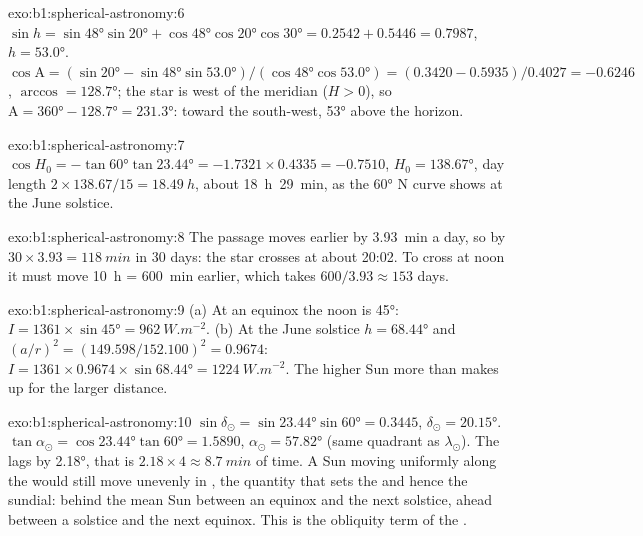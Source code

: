 \begin{solution}{exo:b1:spherical-astronomy:6}
$\sin h = \sin\ang{48}\sin\ang{20} + \cos\ang{48}\cos\ang{20}\cos\ang{30}
= 0.2542 + 0.5446 = 0.7987$, $h = \ang{53.0}$.
$\cos\mathrm{A} = (\sin\ang{20} - \sin\ang{48}\sin\ang{53.0})/(\cos\ang{48}
\cos\ang{53.0}) = (0.3420 - 0.5935)/0.4027 = -0.6246$, $\arccos = \ang{128.7}$;
the star is west of the meridian ($H > 0$), so $\mathrm{A} = \ang{360} -
\ang{128.7} = \ang{231.3}$: toward the south-west, \ang{53} above the horizon.
\end{solution}

\begin{solution}{exo:b1:spherical-astronomy:7}
$\cos H_0 = -\tan\ang{60}\tan\ang{23.44} = -1.7321\times0.4335 = -0.7510$,
$H_0 = \ang{138.67}$, day length $2\times138.67/15 = \qty{18.49}{h}$, about
\qty{18}{h}~\qty{29}{min}, as the \ang{60} N curve shows at the June solstice.
\end{solution}

\begin{solution}{exo:b1:spherical-astronomy:8}
The passage moves earlier by \qty{3.93}{min} a day, so by $30\times3.93 =
\qty{118}{min}$ in 30 days: the star crosses at about 20:02. To cross at
noon it must move \qty{10}{h} = \qty{600}{min} earlier, which takes
$600/3.93 \approx 153$ days.
\end{solution}

\begin{solution}{exo:b1:spherical-astronomy:9}
(a) At an equinox the noon  is \ang{45}: $I = 1361\times\sin\ang{45}
= \qty{962}{W.m^{-2}}$. (b) At the June solstice $h = \ang{68.44}$ and
$(a/r)^2 = (149.598/152.100)^2 = 0.9674$:
$I = 1361\times0.9674\times\sin\ang{68.44} = \qty{1224}{W.m^{-2}}$. The
higher Sun more than makes up for the larger distance.
\end{solution}

\begin{solution}{exo:b1:spherical-astronomy:10}
$\sin\delta_\odot = \sin\ang{23.44}\sin\ang{60} = 0.3445$,
$\delta_\odot = \ang{20.15}$. $\tan\alpha_\odot = \cos\ang{23.44}\tan\ang{60}
= 1.5890$, $\alpha_\odot = \ang{57.82}$ (same quadrant as $\lambda_\odot$).
The  lags by \ang{2.18}, that is $2.18\times4 \approx
\qty{8.7}{min}$ of time. A Sun moving uniformly along the  would
still move unevenly in , the quantity that sets the  and hence the sundial: behind the mean Sun between an equinox and the
next solstice, ahead between a solstice and the next equinox. This is the
obliquity term of the .
\end{solution}


